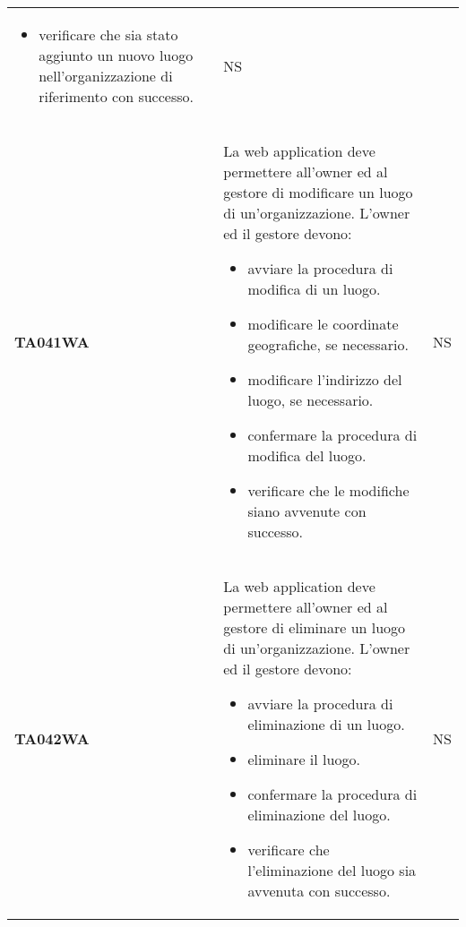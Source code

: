 \documentclass[../piano-di-qualifica.tex]{subfiles}
\begin{document}
\begin{longtable}[H]{>{\centering\bfseries}m{3cm} >{}m{10cm} >{\centering\arraybackslash}m{3cm}}
\begin{itemize}
    \item verificare che sia stato aggiunto un nuovo luogo nell'organizzazione di riferimento con successo.
  \end{itemize}
                    & NS                                                                                                                                                                                                                                                               \\
  TA041WA           & La web application deve permettere all'owner ed al gestore di modificare un luogo di un'organizzazione. \newline
  L'owner ed il gestore devono:
  \begin{itemize}
    \item avviare la procedura di modifica di un luogo.
    \item modificare le coordinate geografiche, se necessario.
    \item modificare l'indirizzo del luogo, se necessario.
    \item confermare la procedura di modifica del luogo.
    \item verificare che le modifiche siano avvenute con successo.
  \end{itemize}
                    & NS                                                                                                                                                                                                                                                               \\
  TA042WA           & La web application deve permettere all'owner ed al gestore di eliminare un luogo di un'organizzazione. \newline
  L'owner ed il gestore devono:
  \begin{itemize}
    \item avviare la procedura di eliminazione di un luogo.
    \item eliminare il luogo.
    \item confermare la procedura di eliminazione del luogo.
    \item verificare che l'eliminazione del luogo sia avvenuta con successo.
  \end{itemize}
                    & NS                                                                                                                                                                                                                                                               \\

\end{longtable}
\end{document}

